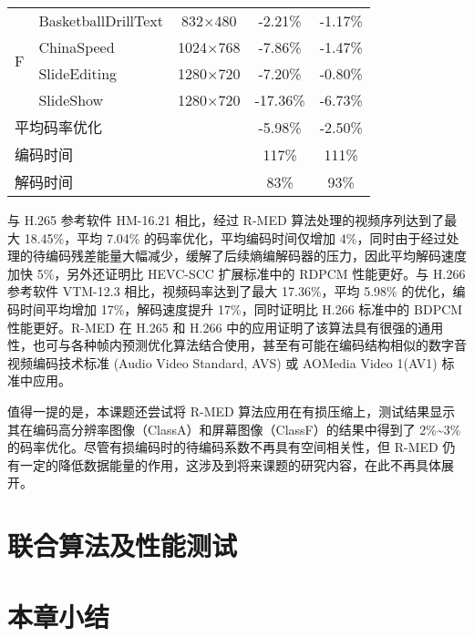 \begin{table}[!p]
\begin{tabular}{@{}clccc@{}}
        \multirow{4}{*}{F}               & BasketballDrillText                       & 832$\times$480          & -2.21\%                            & -1.17\%                    \\
                                         & ChinaSpeed                                & 1024$\times$768         & -7.86\%                            & -1.47\%                    \\
                                         & SlideEditing                              & 1280$\times$720         & -7.20\%                            & -0.80\%                    \\
                                         & SlideShow                                 & 1280$\times$720         & -17.36\%                           & -6.73\%                    \\ \midrule
        \multicolumn{2}{l}{平均码率优化} &                                           & -5.98\%                 & -2.50\%                                                         \\ \midrule
        \multicolumn{2}{l}{编码时间}     &                                           & 117\%                   & 111\%                                                           \\ \midrule
        \multicolumn{2}{l}{解码时间}     &                                           & 83\%                    & 93\%                                                            \\ \bottomrule
    \end{tabular}
\end{table}

与 H.265 参考软件 HM-16.21 相比，经过 R-MED 算法处理的视频序列达到了最大 18.45\%，平均 7.04\% 的码率优化，平均编码时间仅增加 4\%，同时由于经过处理的待编码残差能量大幅减少，缓解了后续熵编解码器的压力，因此平均解码速度加快 5\%，另外还证明比 HEVC-SCC 扩展标准中的 RDPCM 性能更好。与 H.266 参考软件 VTM-12.3 相比，视频码率达到了最大 17.36\%，平均 5.98\% 的优化，编码时间平均增加 17\%，解码速度提升 17\%，同时证明比 H.266 标准中的 BDPCM 性能更好。R-MED 在 H.265 和 H.266 中的应用证明了该算法具有很强的通用性，也可与各种帧内预测优化算法结合使用，甚至有可能在编码结构相似的数字音视频编码技术标准 (Audio Video Standard, AVS) 或 AOMedia Video 1(AV1) 标准中应用。

值得一提的是，本课题还尝试将 R-MED 算法应用在有损压缩上，测试结果显示其在编码高分辨率图像（ClassA）和屏幕图像（ClassF）的结果中得到了 2\%\textasciitilde 3\% 的码率优化。尽管有损编码时的待编码系数不再具有空间相关性，但 R-MED 仍有一定的降低数据能量的作用，这涉及到将来课题的研究内容，在此不再具体展开。

\section{联合算法及性能测试}

\section{本章小结}